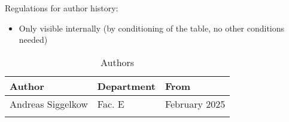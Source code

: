 Regulations for author history:
\begin{itemize}
  \item Only visible internally (by conditioning of the table, no other conditions needed)
\end{itemize}

\begin{table}[H]
\caption{Authors}
\label{tab:gpioauth01a}
\centering
\begin{tabularx}{\textwidth}{|X |X |X |}
  \hline
  Author & Department & From \\
  \hline
  \hline
  Andreas Siggelkow & Fac. E & February 2025 \\
  \hline
  && \\
  \hline
\end{tabularx}
\end{table}
